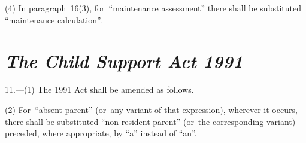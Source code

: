 \documentclass[12pt,a4paper]{article}
\begin{document}
(4) In paragraph~16(3), for~“maintenance assessment” there shall be substituted “maintenance calculation”.


\section*{\itshape The Child Support Act 1991}

11.---(1) The 1991 Act shall be amended as follows.

(2) For~“absent parent” (or~any variant of that expression), wherever it occurs, there shall be substituted “non-resident parent” (or~the corresponding variant) preceded, where appropriate, by “a” instead of “an”.
\end{document}

